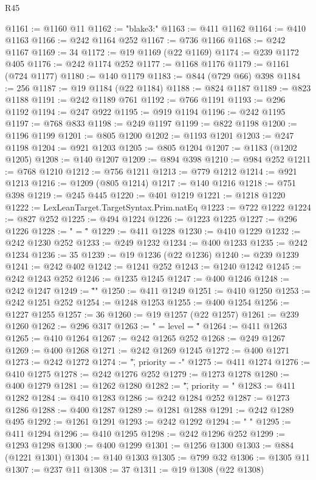 \begin{lexlean}{R45}
\begin{coremodule}
@1161 := @1160 @11
@1162 := "blake3:"
@1163 := @411 @1162
@1164 := @410 @1163
@1166 := @242 @1164 @252
@1167 := @736 @1166
@1168 := @242 @1167
@1169 := 34
@1172 := @19 @1169 (@22 @1169)
@1174 := @239 @1172 @405
@1176 := @242 @1174 @252
@1177 := @1168 @1176
@1179 := @1161 (@724 @1177)
@1180 := @140 @1179
@1183 := @844 (@729 @66) @398
@1184 := 256
@1187 := @19 @1184 (@22 @1184)
@1188 := @824 @1187
@1189 := @823 @1188
@1191 := @242 @1189 @761
@1192 := @766 @1191
@1193 := @296 @1192
@1194 := @247 @922
@1195 := @919 @1194
@1196 := @242 @1195
@1197 := @768 @833
@1198 := @249 @1197
@1199 := @822 @1198
@1200 := @1196 @1199
@1201 := @805 @1200
@1202 := @1193 @1201
@1203 := @247 @1198
@1204 := @921 @1203
@1205 := @805 @1204
@1207 := @1183 (@1202 @1205)
@1208 := @140 @1207
@1209 := @894 @398
@1210 := @984 @252
@1211 := @768 @1210
@1212 := @756 @1211
@1213 := @779 @1212
@1214 := @921 @1213
@1216 := @1209 (@805 @1214)
@1217 := @140 @1216
@1218 := @751 @398
@1219 := @245 @445
@1220 := @401 @1219
@1221 := @1218 @1220
@1222 := LexLeanTarget.TargetSyntax.Prim.natEq
@1223 := @722 @1222
@1224 := @827 @252
@1225 := @494 @1224
@1226 := @1223 @1225
@1227 := @296 @1226
@1228 := " = \""
@1229 := @411 @1228
@1230 := @410 @1229
@1232 := @242 @1230 @252
@1233 := @249 @1232
@1234 := @400 @1233
@1235 := @242 @1234
@1236 := 35
@1239 := @19 @1236 (@22 @1236)
@1240 := @239 @1239
@1241 := @242 @402
@1242 := @1241 @252
@1243 := @1240 @1242
@1245 := @242 @1243 @252
@1246 := @1235 @1245
@1247 := @400 @1246
@1248 := @242 @1247
@1249 := "\"\n"
@1250 := @411 @1249
@1251 := @410 @1250
@1253 := @242 @1251 @252
@1254 := @1248 @1253
@1255 := @400 @1254
@1256 := @1227 @1255
@1257 := 36
@1260 := @19 @1257 (@22 @1257)
@1261 := @239 @1260
@1262 := @296 @317
@1263 := " = { level = \""
@1264 := @411 @1263
@1265 := @410 @1264
@1267 := @242 @1265 @252
@1268 := @249 @1267
@1269 := @400 @1268
@1271 := @242 @1269 @1245
@1272 := @400 @1271
@1273 := @242 @1272
@1274 := "\", priority = -"
@1275 := @411 @1274
@1276 := @410 @1275
@1278 := @242 @1276 @252
@1279 := @1273 @1278
@1280 := @400 @1279
@1281 := @1262 @1280
@1282 := "\", priority = "
@1283 := @411 @1282
@1284 := @410 @1283
@1286 := @242 @1284 @252
@1287 := @1273 @1286
@1288 := @400 @1287
@1289 := @1281 @1288
@1291 := @242 @1289 @495
@1292 := @1261 @1291
@1293 := @242 @1292
@1294 := " }\n"
@1295 := @411 @1294
@1296 := @410 @1295
@1298 := @242 @1296 @252
@1299 := @1293 @1298
@1300 := @400 @1299
@1301 := @1256 @1300
@1303 := @884 (@1221 @1301)
@1304 := @140 @1303
@1305 := @799 @32
@1306 := @1305 @11
@1307 := @237 @11
@1308 := 37
@1311 := @19 @1308 (@22 @1308)

\end{coremodule}
\end{lexlean}

